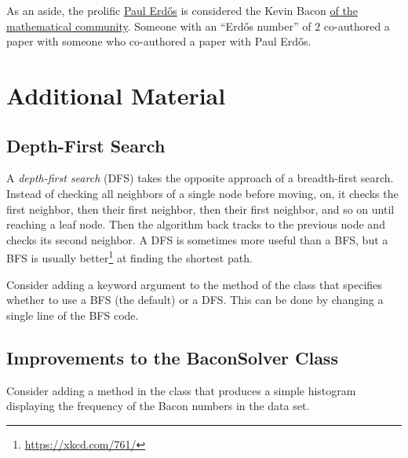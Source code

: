 As an aside, the prolific \href{https://en.wikipedia.org/wiki/Erd%C5%91s_number}{Paul Erd\H{o}s} is considered the Kevin Bacon \href{https://xkcd.com/599/}{of the mathematical community}.
Someone with an ``Erd\H{o}s number'' of $2$ co-authored a paper with someone who co-authored a paper with Paul Erd\H{o}s.

\newpage

\section*{Additional Material} %

\subsection*{Depth-First Search} %


A \emph{depth-first search} (DFS) takes the opposite approach of a breadth-first search.
Instead of checking all neighbors of a single node before moving, on, it checks the first neighbor, then their first neighbor, then their first neighbor, and so on until reaching a leaf node.
Then the algorithm back tracks to the previous node and checks its second neighbor.
A DFS is sometimes more useful than a BFS, but a BFS is usually better\footnote{\url{https://xkcd.com/761/}} at finding the shortest path.

Consider adding a keyword argument to the  method of the  class that specifies whether to use a BFS (the default) or a DFS.
This can be done by changing a single line of the BFS code.

\subsection*{Improvements to the BaconSolver Class} %

Consider adding a  method in the  class that produces a simple histogram displaying the frequency of the Bacon numbers in the data set.



